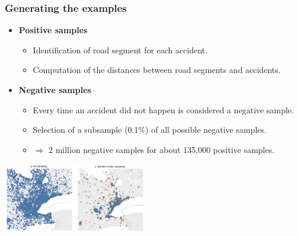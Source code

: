 \documentclass[slidestop,compress,red,mathserif]{beamer}
\newcommand{\colorcite}[1]{\colorlet{saved}{.}\color{sangria}\cite{#1}\color{saved}}
\begin{document}
\begin{frame}
	\frametitle{Generating the examples}
  \begin{itemize}
  \item[] \textbf{Positive samples}
    \begin{itemize}
      \item Identification of road segment for each accident.
      \item Computation of the distances between road segments and accidents.
    \end{itemize}
  \item[] \textbf{Negative samples}
    \begin{itemize}
      \item Every time an accident did not happen is considered a negative sample.
      \item Selection of a subsample (0.1\%) of all possible negative samples.
      \item $\Rightarrow$ 2 million negative samples for about 135,000 positive samples.
    \end{itemize}
    \end{itemize}
    \centering
    \includegraphics[height=3cm]{Figures/imbalance-monika.png} \\
    \begin{tiny}
    \colorcite{sharma2018data}
    \end{tiny}
\end{frame}
\end{document}
